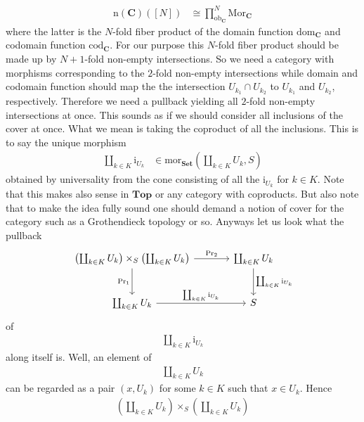 \begin{align*}
  \mathrm{n}
  \left(
    \mathbf{C}
  \right)
  ([N])
  &\cong
  \prod_{\mathrm{ob}_{\mathbf{C}}}^{N}
  \mathrm{Mor}_{\mathbf{C}}
\end{align*}
where the latter is the $N$-fold fiber product of the domain function $\mathrm{dom}_{\mathbf{C}}$ and codomain function $\mathrm{cod}_{\mathbf{C}}$. For our purpose this $N$-fold fiber product should be made up by $N+1$-fold non-empty intersections. So we need a category with morphisms corresponding to the $2$-fold non-empty intersections while domain and codomain function should map the the intersection $U_{k_{1}} \cap U_{k_{2}}$ to $U_{k_{1}}$ and $U_{k_{2}}$, respectively. Therefore we need a pullback yielding all $2$-fold non-empty intersections at once. This sounds as if we should consider all inclusions of the cover at once. What we mean is taking the {\glqq}coproduct{\grqq} of all the inclusions. This is to say the unique morphism
\begin{align*}
  \coprod_{k \in K}
  \mathrm{i}_{U_{k}}
  &\in
  \mathrm{mor}_{\mathbf{Set}}
  \left(
    \coprod_{k \in K}
    U_{k},
    S
  \right)
\end{align*}
obtained by universality from the cone consisting of all the $\mathrm{i}_{U_{k}}$ for $k \in K$. Note that this makes also sense in $\mathbf{Top}$ or any category with coproducts. But also note that to make the idea fully sound one should demand a notion of cover for the category such as a Grothendieck topology or so. Anyways let us look what the pullback
\[
\begin{tikzcd}[sep=large]
  \left(
    \coprod_{k \in K}
    U_{k}
  \right)
  \times_{S}
  \left(
    \coprod_{k \in K}
    U_{k}
  \right)
  \arrow{r}{\mathrm{Pr_{2}}}
  \arrow[swap]{d}{\mathrm{Pr_{1}}}
  &
  \coprod_{k \in K}
  U_{k}
  \arrow{d}{\coprod_{k \in K}\mathrm{i}_{U_{k}}}
  \\
  \coprod_{k \in K}
  U_{k}
  \arrow{r}{\coprod_{k \in K}\mathrm{i}_{U_{k}}}
  &
  S
\end{tikzcd}
\]
of
\begin{align*}
  \coprod_{k \in K}
  \mathrm{i}_{U_{k}}
\end{align*}
along itself is. Well, an element of
\begin{align*}
  \coprod_{k \in K}
  U_{k}
\end{align*}
can be regarded as a pair $(x,U_{k})$ for some $k \in K$ such that $x \in U_{k}$. Hence
\begin{align*}
  \left(
    \coprod_{k \in K}
    U_{k}
  \right)
  \times_{S}
  \left(
    \coprod_{k \in K}
    U_{k}
  \right)
\end{align*}
